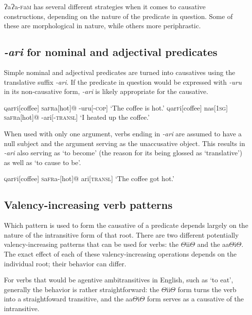 \documentclass[a4paper,10pt,twoside,openright]{memoir}
\newcommand{\lang}{ɁaɁa-\textsc{f}a\textsc{m}}
\newcommand{\rootpart}{$\Theta$}
\newcommand{\famword}[5]{#1\textsc{#2}#3\textsc{#4}#5}
\begin{document}
\lang{} has several different strategies when it comes to causative constructions, depending on the nature of the predicate in question. Some of these are morphological in nature, while others more periphrastic. 

\subsection{\textit{-ari} for nominal and adjectival predicates}

Simple nominal and adjectival predicates are turned into causatives using the translative suffix \textit{-ari}. If the predicate in question would be expressed with \textit{-uru} in its non-causative form, \textit{-ari} is likely appropriate for the causative.

\pex
\a
\begingl
\famword{}{q}{ar}{f}{i}[coffee]
\famword{}{s}{a}{fr}{a}[hot]@
-uru[\textsc{-cop}]
\glft `The coffee is hot.'
\endgl
\a
\begingl
\famword{}{q}{ar}{f}{i}[coffee]
nas[\textsc{1sg}]
\famword{}{s}{a}{fr}{a}[hot]@
-ari[-\textsc{transl}]
\glft `I heated up the coffee.'
\endgl
\xe

When used with only one argument, verbs ending in \textit{-ari} are assumed to have a null subject and the argument serving as the unaccusative object. This results in \textit{-ari} also serving as `to become' (the reason for its being glossed as `translative') as well as `to cause to be'.

\ex
\begingl
\famword{}{q}{ar}{f}{i}[coffee]
\famword{}{s}{a}{fr}{a}-[hot]@
ari[\textsc{transl}]
\glft `The coffee got hot.'
\endgl
\xe

\subsection{Valency-increasing verb patterns}

Which pattern is used to form the causative of a predicate depends largely on the nature of the intransitive form of that root. There are two different potentially valency-increasing patterns that can be used for verbs: the {\rootpart}ii{\rootpart} and the aa{\rootpart}i{\rootpart}. The exact effect of each of these valency-increasing operations depends on the individual root; their behavior can differ.

For verbs that would be agentive ambitransitives in English, such as `to eat', generally the behavior is rather straightforward: the {\rootpart}ii{\rootpart} form turns the verb into a straightfoward transitive, and the aa{\rootpart}i{\rootpart} form serves as a causative of the intransitive. 
\end{document}
